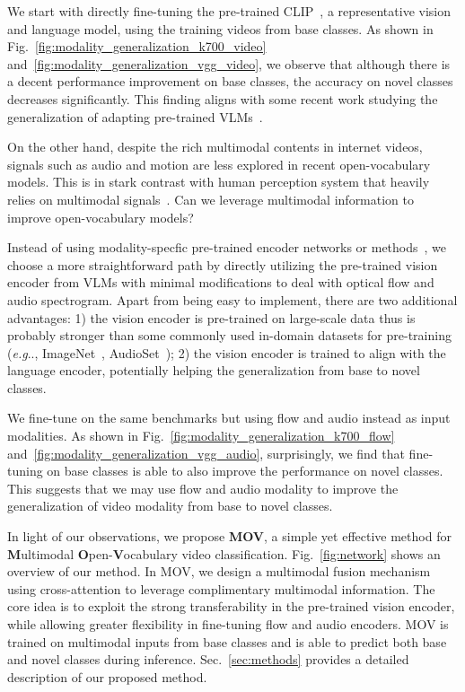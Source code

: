 \documentclass{article}
\makeatletter
\DeclareRobustCommand\onedot{\futurelet\@let@token\@onedot}
\def\@onedot{\ifx\@let@token.\else.\null\fi\xspace}
\def\eg{\emph{e.g}\onedot} \def\Eg{\emph{E.g}\onedot}
\makeatother
\begin{document}
We start with directly fine-tuning the pre-trained CLIP~\cite{radford2021learning}, a representative vision and language model, using the training videos from base classes. 
As shown in Fig.~\ref{fig:modality_generalization_k700_video} and~\ref{fig:modality_generalization_vgg_video}, we observe that although there is a decent performance improvement on base classes, the accuracy on novel classes decreases significantly.
This finding aligns with some recent work studying the generalization of adapting pre-trained VLMs~\cite{zhou2022cocoop}.

On the other hand, despite the rich multimodal contents in internet videos, signals such as audio and motion are less explored in recent open-vocabulary models.
This is in stark contrast with human perception system that heavily relies on multimodal signals~\cite{smith2005development}.
Can we leverage multimodal information to improve open-vocabulary models?

Instead of using modality-specfic pre-trained encoder networks or methods~\cite{wang2016temporal, hershey2017cnn}, we choose a more straightforward path by directly utilizing the pre-trained vision encoder from VLMs with minimal modifications to deal with optical flow and audio spectrogram. 
Apart from being easy to implement, there are two additional advantages: 1) the vision encoder is pre-trained on large-scale data thus is probably stronger than some commonly used in-domain datasets for pre-training (\eg, ImageNet~\cite{deng2009imagenet}, AudioSet~\cite{gemmeke2017audio}); 2) the vision encoder is trained to align with the language encoder, potentially helping the generalization from base to novel classes.

We fine-tune on the same benchmarks but using flow and audio instead as input modalities.
As shown in Fig.~\ref{fig:modality_generalization_k700_flow} and~\ref{fig:modality_generalization_vgg_audio}, surprisingly, we find that fine-tuning on base classes is able to also improve the performance on novel classes.
This suggests that we may use flow and audio modality to improve the generalization of video modality from base to novel classes.

In light of our observations, we propose \textbf{MOV}, a simple yet effective method for \textbf{M}ultimodal \textbf{O}pen-\textbf{V}ocabulary video classification.
Fig.~\ref{fig:network} shows an overview of our method.
In MOV, we design a multimodal fusion mechanism using cross-attention to leverage complimentary multimodal information. 
The core idea is to exploit the strong transferability in the pre-trained vision encoder, while allowing greater flexibility in fine-tuning flow and audio encoders.
MOV is trained on multimodal inputs from base classes and is able to predict both base and novel classes during inference.
Sec.~\ref{sec:methods} provides a detailed description of our proposed method.
\end{document}
